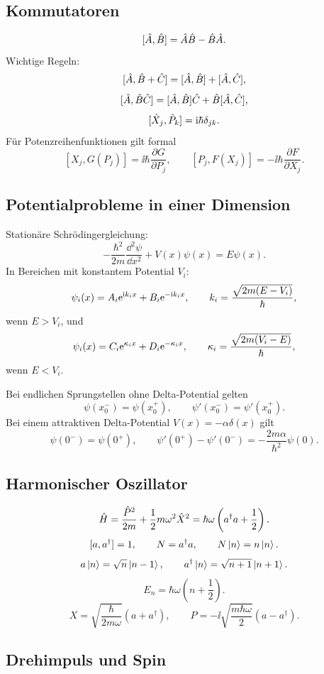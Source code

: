 \subsection{Kommutatoren}

\[
    [\hat A,\hat B]=\hat A\hat B-\hat B\hat A.
\]
Wichtige Regeln:
\[
    [\hat A,\hat B+\hat C]=[\hat A,\hat B]+[\hat A,\hat C],
\]
\[
    [\hat A,\hat B\hat C]=[\hat A,\hat B]\hat C+\hat B[\hat A,\hat C],
\]
\[
    [\hat X_j,\hat P_k]=\mathrm{i}\hbar\delta_{jk}.
\]
Für Potenzreihenfunktionen gilt formal
\[
    [X_j,G(P_j)]=\ii\hbar\frac{\partial G}{\partial P_j},
    \qquad
    [P_j,F(X_j)]=-\ii\hbar\frac{\partial F}{\partial X_j}.
\]

\subsection{Potentialprobleme in einer Dimension}

Stationäre Schrödingergleichung:
\[
    -\frac{\hbar^2}{2m}\frac{\dd^2\psi}{\dd x^2}+V(x)\psi(x)=E\psi(x).
\]
In Bereichen mit konstantem Potential $V_i$:
\[
    \psi_i(x)=A_i\mathrm{e}^{\mathrm{i} k_i x}+B_i\mathrm{e}^{-\mathrm{i} k_i x},
    \qquad
    k_i=\frac{\sqrt{2m(E-V_i)}}{\hbar},
\]
wenn $E>V_i$, und
\[
    \psi_i(x)=C_i\mathrm{e}^{\kappa_i x}+D_i\mathrm{e}^{-\kappa_i x},
    \qquad
    \kappa_i=\frac{\sqrt{2m(V_i-E)}}{\hbar},
\]
wenn $E<V_i$.

Bei endlichen Sprungstellen ohne Delta-Potential gelten
\[
    \psi(x_0^-)=\psi(x_0^+),
    \qquad
    \psi'(x_0^-)=\psi'(x_0^+).
\]
Bei einem attraktiven Delta-Potential $V(x)=-\alpha\delta(x)$ gilt
\[
    \psi(0^-)=\psi(0^+),
    \qquad
    \psi'(0^+)-\psi'(0^-)
    =-\frac{2m\alpha}{\hbar^2}\psi(0).
\]

\subsection{Harmonischer Oszillator}

\[
    \hat H=\frac{\hat P^2}{2m}+\frac12m\omega^2\hat X^2
    =\hbar\omega\left(a^\dagger a+\frac12\right).
\]
\[
    [a,a^\dagger]=1,
    \qquad
    N=a^\dagger a,
    \qquad
    N\left|n\right\rangle=n\left|n\right\rangle.
\]
\[
    a\left|n\right\rangle=\sqrt n\left|n-1\right\rangle,
    \qquad
    a^\dagger\left|n\right\rangle=\sqrt{n+1}\left|n+1\right\rangle.
\]
\[
    E_n=\hbar\omega\left(n+\frac12\right).
\]
\[
    X=\sqrt{\frac{\hbar}{2m\omega}}(a+a^\dagger),
    \qquad
    P=-\ii\sqrt{\frac{m\hbar\omega}{2}}(a-a^\dagger).
\]

\subsection{Drehimpuls und Spin}

